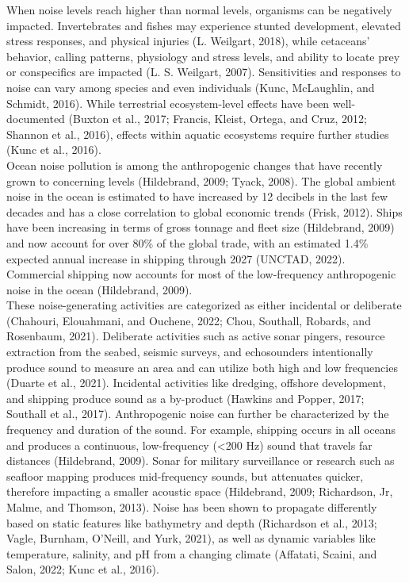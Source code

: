 \documentclass[
]{article}
\begin{document}
When noise levels reach higher than normal levels, organisms can be
negatively impacted. Invertebrates and fishes may experience stunted
development, elevated stress responses, and physical injuries (L.
Weilgart, 2018), while cetaceans' behavior, calling patterns, physiology
and stress levels, and ability to locate prey or conspecifics are
impacted (L. S. Weilgart, 2007). Sensitivities and responses to noise
can vary among species and even individuals (Kunc, McLaughlin, and
Schmidt, 2016). While terrestrial ecosystem-level effects have been
well-documented (Buxton et al., 2017; Francis, Kleist, Ortega, and Cruz,
2012; Shannon et al., 2016), effects within aquatic ecosystems require
further studies (Kunc et al., 2016).\\

Ocean noise pollution is among the anthropogenic changes that have
recently grown to concerning levels (Hildebrand, 2009; Tyack, 2008). The
global ambient noise in the ocean is estimated to have increased by 12
decibels in the last few decades and has a close correlation to global
economic trends (Frisk, 2012). Ships have been increasing in terms of
gross tonnage and fleet size (Hildebrand, 2009) and now account for over
80\% of the global trade, with an estimated 1.4\% expected annual
increase in shipping through 2027 (UNCTAD, 2022). Commercial shipping
now accounts for most of the low-frequency anthropogenic noise in the
ocean (Hildebrand, 2009).\\

These noise-generating activities are categorized as either incidental
or deliberate (Chahouri, Elouahmani, and Ouchene, 2022; Chou, Southall,
Robards, and Rosenbaum, 2021). Deliberate activities such as active
sonar pingers, resource extraction from the seabed, seismic surveys, and
echosounders intentionally produce sound to measure an area and can
utilize both high and low frequencies (Duarte et al., 2021). Incidental
activities like dredging, offshore development, and shipping produce
sound as a by-product (Hawkins and Popper, 2017; Southall et al., 2017).
Anthropogenic noise can further be characterized by the frequency and
duration of the sound. For example, shipping occurs in all oceans and
produces a continuous, low-frequency (\textless200 Hz) sound that
travels far distances (Hildebrand, 2009). Sonar for military
surveillance or research such as seafloor mapping produces mid-frequency
sounds, but attenuates quicker, therefore impacting a smaller acoustic
space (Hildebrand, 2009; Richardson, Jr, Malme, and Thomson, 2013).
Noise has been shown to propagate differently based on static features
like bathymetry and depth (Richardson et al., 2013; Vagle, Burnham,
O'Neill, and Yurk, 2021), as well as dynamic variables like temperature,
salinity, and pH from a changing climate (Affatati, Scaini, and Salon,
2022; Kunc et al., 2016).\\
\end{document}
